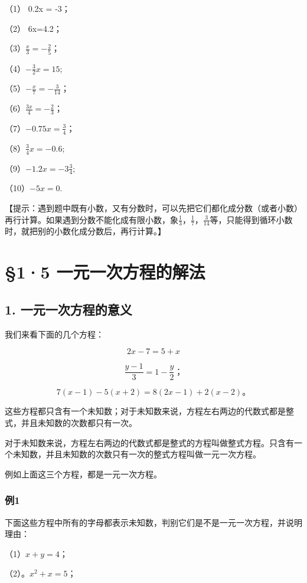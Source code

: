 （1） 0.2x = -3；

（2） 6x=4.2；

（3）\(\frac{x}{3} = -\frac{2}{5}\)；

（4）\(-\frac{3}{2} x = 15;\)

（5）\(-\frac{x}{7} = -\frac{3}{14}\)；

（6）\(\frac{3x}{4} = -\frac{2}{3}\)；

（7）\(-0.75x = \frac{3}{4}\)；

（8）\(\frac{3}{4} x = -0.6;\)

（9）\(-1.2x = -3\frac{3}{4};\)

（10）\(-5x = 0.\)

【提示：遇到题中既有小数，又有分数时，可以先把它们都化成分数（或者小数）再行计算。如果遇到分数不能化成有限小数，象\(\frac{1}{3}\)，\(\frac{1}{7}\)，\(\frac{3}{14}\)等，只能得到循环小数时，就把别的小数化成分数后，再行计算。】

\section{§1·5 一元一次方程的解法}

\subsection{1. 一元一次方程的意义}

我们来看下面的几个方程：

\[
2 x - 7 = 5 + x
\]

\[
\frac{y - 1}{3} = 1 - \frac{y}{2}\text{；}
\]

\[
7 (x - 1) - 5 (x + 2) = 8 (2 x - 1) + 2 (x - 2)\text{。}
\]

这些方程都只含有一个未知数；对于未知数来说，方程左右两边的代数式都是整式，并且未知数的次数都只有一次。

对于未知数来说，方程左右两边的代数式都是整式的方程叫做整式方程。只含有一个未知数，并且未知数的次数只有一次的整式方程叫做一元一次方程。

例如上面这三个方程，都是一元一次方程。

\subsubsection{例1}

下面这些方程中所有的字母都表示未知数，判别它们是不是一元一次方程，并说明理由：

（1）\(x + y = 4\)；

（2）。\(x^{2} + x = 5\)；

